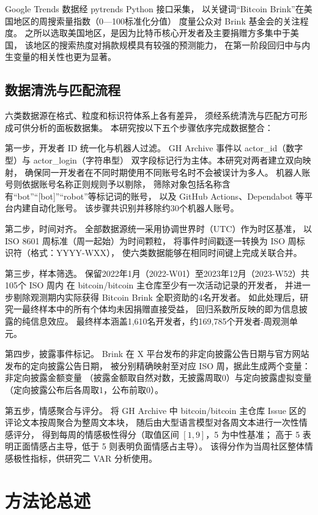 \documentclass[
    type = master, %
    degree = professional,        %
    decl-page,  %
    twoside,                %
    fontset = fandol %
  ]{njuthesis}
\begin{document}
Google Trends 数据经 pytrends Python 接口采集，
以关键词“Bitcoin Brink”在美国地区的周搜索量指数（0—100标准化分值）
度量公众对 Brink 基金会的关注程度。
之所以选取美国地区，是因为比特币核心开发者及主要捐赠方多集中于美国，
该地区的搜索热度对捐款规模具有较强的预测能力，
在第一阶段回归中与内生变量的相关性也更为显著。

\subsection{数据清洗与匹配流程}

六类数据源在格式、粒度和标识符体系上各有差异，
须经系统清洗与匹配方可形成可供分析的面板数据集。
本研究按以下五个步骤依序完成数据整合：

第一步，开发者 ID 统一化与机器人过滤。
GH Archive 事件以 actor\_id（数字型）与 actor\_login（字符串型）
双字段标记行为主体。本研究对两者建立双向映射，
确保同一开发者在不同时期使用不同账号名时不会被误计为多人。
机器人账号则依据账号名称正则规则予以剔除，
筛除对象包括名称含有“bot”“[bot]”“robot”等标记词的账号，
以及 GitHub Actions、Dependabot 等平台内建自动化账号。
该步骤共识别并移除约30个机器人账号。

第二步，时间对齐。
全部数据源统一采用协调世界时（UTC）作为时区基准，
以 ISO 8601 周标准（周一起始）为时间颗粒，
将事件时间戳逐一转换为 ISO 周标识符（格式：YYYY-WXX），
使六类数据能够在相同时间键上完成关联合并。

第三步，样本筛选。
保留2022年1月（2022-W01）至2023年12月（2023-W52）共105个 ISO 周内
在 bitcoin/bitcoin 主仓库至少有一次活动记录的开发者，
并进一步剔除观测期内实际获得 Bitcoin Brink 全职资助的4名开发者。
如此处理后，研究一最终样本中的所有个体均未因捐赠直接受益，
回归系数所反映的即为信息披露的纯信息效应。
最终样本涵盖1,610名开发者，约169,785个开发者-周观测单元。

第四步，披露事件标记。
Brink 在 X 平台发布的非定向披露公告日期与官方网站发布的定向披露公告日期，
被分别精确映射至对应 ISO 周，据此生成两个变量：非定向披露金额变量
（披露金额取自然对数，无披露周取0）与定向披露虚拟变量
（定向披露公布后各周取1，公布前取0）。

第五步，情感聚合与评分。
将 GH Archive 中 bitcoin/bitcoin 主仓库 Issue 区的评论文本按周聚合为整周文本块，
随后由大型语言模型对各周文本进行一次性情感评分，
得到每周的情感极性得分（取值区间 $[1, 9]$，5 为中性基准；
高于 5 表明正面情感占主导，低于 5 则表明负面情感占主导）。
该得分作为当周社区整体情感极性指标，供研究二 VAR 分析使用。

\section{方法论总述}
\end{document}
